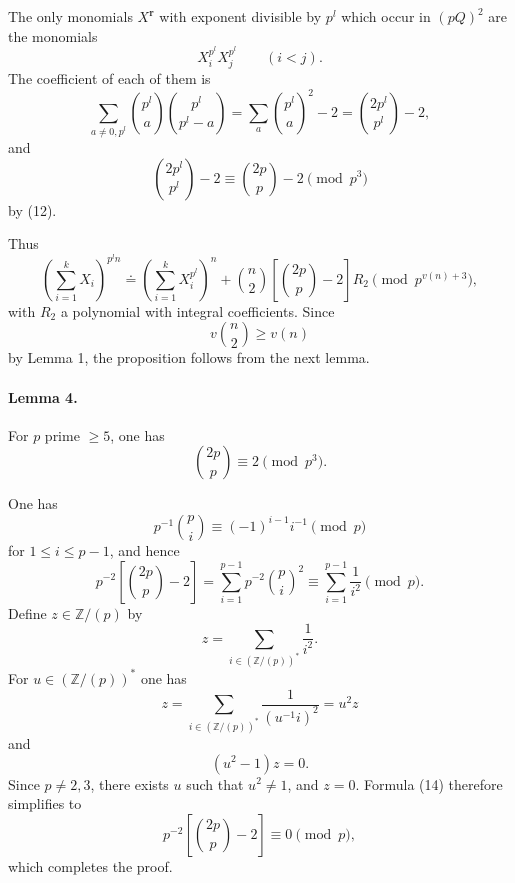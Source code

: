 \documentclass[10pt]{article}
\newcommand{\Z}{\mathbb Z}
\newcommand{\dd}{\mathrel{\doteq}}
\newcommand{\rr}{\mathbf r}
\begin{document}
The only monomials $X^\rr$ with exponent divisible by $p^l$ which occur in $(pQ)^2$ are the monomials
\[
X_i^{p^l}X_j^{p^l}\qquad(i<j).
\]
The coefficient of each of them is
\[
\sum_{a\ne0,p^l}\binom{p^l}{a}\binom{p^l}{p^l-a}
=
\sum_a \binom{p^l}{a}^2-2
=
\binom{2p^l}{p^l}-2, \tag{13}
\]
and
\[
\binom{2p^l}{p^l}-2
\equiv
\binom{2p}{p}-2
\pmod {p^3}
\]
by (12).

Thus
\[
\left(\sum_{i=1}^k X_i\right)^{p^l n}
\dd
\left(\sum_{i=1}^k X_i^{p^l}\right)^n
+\binom n2\left[\binom{2p}{p}-2\right]R_2
\pmod {p^{v(n)+3}},
\]
with $R_2$ a polynomial with integral coefficients. Since
\[
v\binom n2\ge v(n)
\]
by Lemma 1, the proposition follows from the next lemma.

\paragraph{Lemma 4.} For $p$ prime $\ge5$, one has
\[
\binom{2p}{p}\equiv2\pmod {p^3}.
\]

One has
\[
p^{-1}\binom pi\equiv(-1)^{i-1}i^{-1}\pmod p
\]
for $1\le i\le p-1$, and hence
\[
p^{-2}\left[\binom{2p}{p}-2\right]
=
\sum_{i=1}^{p-1}p^{-2}\binom pi^2
\equiv
\sum_{i=1}^{p-1}\frac{1}{i^2}
\pmod p. \tag{14}
\]
Define $z\in\Z/(p)$ by
\[
z=\sum_{i\in(\Z/(p))^*}\frac1{i^2}.
\]
For $u\in(\Z/(p))^*$ one has
\[
z=\sum_{i\in(\Z/(p))^*}\frac{1}{(u^{-1}i)^2}=u^2z
\]
and
\[
(u^2-1)z=0.
\]
Since $p\ne2,3$, there exists $u$ such that $u^2\ne1$, and $z=0$. Formula (14) therefore simplifies to
\[
p^{-2}\left[\binom{2p}{p}-2\right]\equiv0\pmod p,
\]
which completes the proof.
\end{document}
